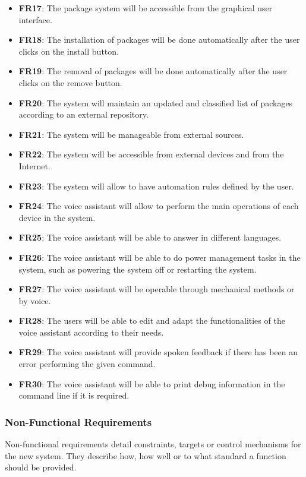 \begin{itemize}
    \item \textbf{FR17}: The package system will be accessible from the graphical user interface.
    \item \textbf{FR18}: The installation of packages will be done automatically after the user clicks on the install button.
    \item \textbf{FR19}: The removal of packages will be done automatically after the user clicks on the remove button.
    \item \textbf{FR20}: The system will maintain an updated and classified list of packages according to an external repository.
    \item \textbf{FR21}: The system will be manageable from external sources.
    \item \textbf{FR22}: The system will be accessible from external devices and from the Internet.
    \item \textbf{FR23}: The system will allow to have automation rules defined by the user.
    \item \textbf{FR24}: The voice assistant will allow to perform the main operations of each device in the system.
    \item \textbf{FR25}: The voice assistant will be able to answer in different languages.
    \item \textbf{FR26}: The voice assistant will be able to do power management tasks in the system, such as powering the system
    off or restarting the system.
    \item \textbf{FR27}: The voice assistant will be operable through mechanical methods or by voice.
    \item \textbf{FR28}: The users will be able to edit and adapt the functionalities of the voice assistant according to their needs.
    \item \textbf{FR29}: The voice assistant will provide spoken feedback if there has been an error performing the given command.
    \item \textbf{FR30}: The voice assistant will be able to print debug information in the command line if it is required.
\end{itemize}

\subsubsection{Non-Functional Requirements}
Non-functional requirements detail constraints, targets or control mechanisms for the new system. They describe how, how well or
to what standard a function should be provided.\cite{sqaFunctionalNonFunctional}

